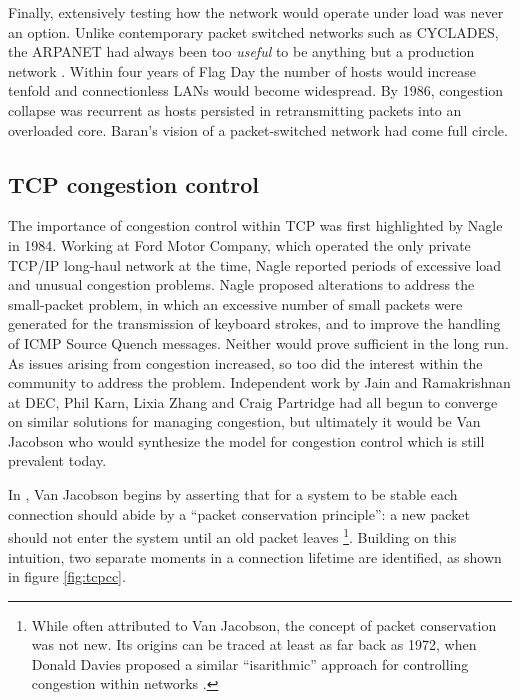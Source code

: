 Finally, extensively testing how the network would operate under load was never an option. 
Unlike contemporary packet switched networks such as CYCLADES, the \ac{ARPANET} had always been too \textit{useful} to be anything but a production network \cite{Day:2010p187}. 
Within four years of Flag Day the number of hosts would increase tenfold and connectionless \acp{LAN} would become widespread. 
By 1986, congestion collapse was recurrent as hosts persisted in retransmitting packets into an overloaded core.
Baran's vision of a packet-switched network had come full circle.

\subsection{\acs{TCP} congestion control}
\label{sec:resourcepooling:tcp}

The importance of congestion control within \ac{TCP} was first highlighted by Nagle \cite{Nagle:1984p458} in 1984. 
Working at Ford Motor Company, which operated the only private \ac{TCP}/\ac{IP} long-haul network at the time, Nagle reported periods of excessive load and unusual congestion problems. 
Nagle proposed alterations to address the small-packet problem, in which an excessive number of small packets were generated for the transmission of keyboard strokes, and to improve the handling of \ac{ICMP} Source Quench messages. 
Neither would prove sufficient in the long run.  
As issues arising from congestion increased, so too did the interest within the community to address the problem. 
Independent work by Jain and Ramakrishnan at \ac{DEC}, Phil Karn, Lixia Zhang and Craig Partridge had all begun to converge on similar solutions for managing congestion, but ultimately it would be Van Jacobson who would synthesize the model for congestion control which is still prevalent today.

In \cite{Jacobson:1988p398}, Van Jacobson begins by asserting that for a system to be stable each connection should abide by a ``packet conservation principle'': a new packet should not enter the system until an old packet leaves \footnote{While often attributed to Van Jacobson, the concept of packet conservation was not new. Its origins can be traced at least as far back as 1972, when Donald Davies proposed a similar ``isarithmic'' approach for controlling congestion within networks \cite{Davies:1972p473}.}. 
Building on this intuition, two separate moments in a connection lifetime are identified, as shown in figure \ref{fig:tcpcc}. 

